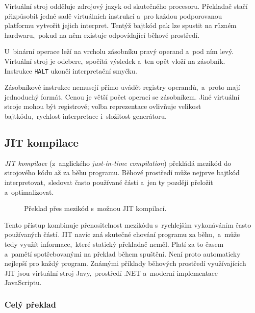 Virtuální stroj odděluje zdrojový jazyk od skutečného procesoru. Překladač stačí přizpůsobit jedné sadě virtuálních instrukcí a~pro každou podporovanou platformu vytvořit jejich interpret. Tentýž bajtkód pak lze spustit na různém hardwaru,~pokud na něm existuje odpovídající běhové prostředí.



U~binární operace leží na vrcholu zásobníku pravý operand a~pod ním levý. Virtuální stroj je odebere,~spočítá výsledek a~ten opět vloží na zásobník. Instrukce \texttt{HALT} ukončí interpretační smyčku.

Zásobníkové instrukce nemusejí přímo uvádět registry operandů,~a~proto mají jednoduchý formát. Cenou je větší počet operací se zásobníkem. Jiné virtuální stroje mohou být registrové; volba reprezentace ovlivňuje velikost bajtkódu,~rychlost interpretace i~složitost generátoru.

\subsection{JIT kompilace}

\emph{JIT kompilace} (z~anglického \emph{just-in-time compilation}) překládá mezikód do strojového kódu až za běhu programu. Běhové prostředí může nejprve bajtkód interpretovat,~sledovat často používané části a~jen ty později přeložit a~optimalizovat.

\begin{figure}[h]
    \centering
    \resizebox{\textwidth}{!}{}
    \caption{Překlad přes mezikód s~možnou JIT kompilací.}
    \label{fig:jit}
\end{figure}

Tento přístup kombinuje přenositelnost mezikódu s~rychlejším vykonáváním často používaných částí. JIT navíc zná skutečné chování programu za běhu,~a~může tedy využít informace,~které statický překladač neměl. Platí za to časem a~pamětí spotřebovanými na překlad během spuštění. Není proto automaticky nejlepší pro každý program. Známými příklady běhových prostředí využívajících JIT jsou virtuální stroj Javy,~prostředí .NET a~moderní implementace JavaScriptu.

\subsubsection*{Celý překlad}

